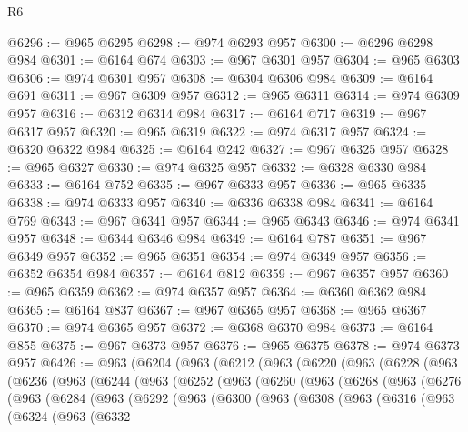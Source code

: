 \begin{lexlean}{R6}
\begin{coremodule}
@6296 := @965 @6295
@6298 := @974 @6293 @957
@6300 := @6296 @6298 @984
@6301 := @6164 @674
@6303 := @967 @6301 @957
@6304 := @965 @6303
@6306 := @974 @6301 @957
@6308 := @6304 @6306 @984
@6309 := @6164 @691
@6311 := @967 @6309 @957
@6312 := @965 @6311
@6314 := @974 @6309 @957
@6316 := @6312 @6314 @984
@6317 := @6164 @717
@6319 := @967 @6317 @957
@6320 := @965 @6319
@6322 := @974 @6317 @957
@6324 := @6320 @6322 @984
@6325 := @6164 @242
@6327 := @967 @6325 @957
@6328 := @965 @6327
@6330 := @974 @6325 @957
@6332 := @6328 @6330 @984
@6333 := @6164 @752
@6335 := @967 @6333 @957
@6336 := @965 @6335
@6338 := @974 @6333 @957
@6340 := @6336 @6338 @984
@6341 := @6164 @769
@6343 := @967 @6341 @957
@6344 := @965 @6343
@6346 := @974 @6341 @957
@6348 := @6344 @6346 @984
@6349 := @6164 @787
@6351 := @967 @6349 @957
@6352 := @965 @6351
@6354 := @974 @6349 @957
@6356 := @6352 @6354 @984
@6357 := @6164 @812
@6359 := @967 @6357 @957
@6360 := @965 @6359
@6362 := @974 @6357 @957
@6364 := @6360 @6362 @984
@6365 := @6164 @837
@6367 := @967 @6365 @957
@6368 := @965 @6367
@6370 := @974 @6365 @957
@6372 := @6368 @6370 @984
@6373 := @6164 @855
@6375 := @967 @6373 @957
@6376 := @965 @6375
@6378 := @974 @6373 @957
@6426 := @963
    (@6204
      (@963
        (@6212
          (@963
            (@6220
              (@963
                (@6228
                  (@963
                    (@6236
                      (@963
                        (@6244
                          (@963
                            (@6252
                              (@963
                                (@6260
                                  (@963
                                    (@6268
                                      (@963
                                        (@6276
                                          (@963
                                            (@6284
                                              (@963
                                                (@6292
                                                  (@963
                                                    (@6300
                                                      (@963
                                                        (@6308
                                                          (@963
                                                            (@6316
                                                              (@963
                                                                (@6324
                                                                  (@963
                                                                    (@6332

\end{coremodule}
\end{lexlean}
